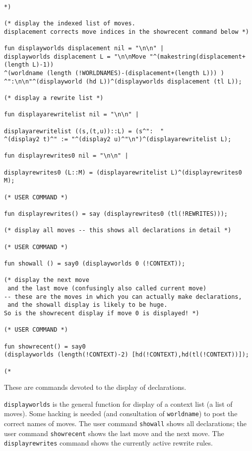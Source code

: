 \documentclass{article}
\begin{document}
\begin{verbatim}

*)

(* display the indexed list of moves.  
displacement corrects move indices in the showrecent command below *)

fun displayworlds displacement nil = "\n\n" |
displayworlds displacement L = "\n\nMove "^(makestring(displacement+(length L)-1))
^(worldname (length (!WORLDNAMES)-(displacement+(length L))) )
^":\n\n"^(displayworld (hd L))^(displayworlds displacement (tl L));

(* display a rewrite list *)

fun displayarewritelist nil = "\n\n" |

displayarewritelist ((s,(t,u))::L) = (s^":  "
^(display2 t)^" := "^(display2 u)^"\n")^(displayarewritelist L);

fun displayrewrites0 nil = "\n\n" |

displayrewrites0 (L::M) = (displayarewritelist L)^(displayrewrites0 M);

(* USER COMMAND *)

fun displayrewrites() = say (displayrewrites0 (tl(!REWRITES)));

(* display all moves -- this shows all declarations in detail *)

(* USER COMMAND *)

fun showall () = say0 (displayworlds 0 (!CONTEXT));

(* display the next move
 and the last move (confusingly also called current move) 
-- these are the moves in which you can actually make declarations,
 and the showall display is likely to be huge.  
So is the showrecent display if move 0 is displayed! *)

(* USER COMMAND *)

fun showrecent() = say0 
(displayworlds (length(!CONTEXT)-2) [hd(!CONTEXT),hd(tl(!CONTEXT))]);

(*

\end{verbatim}

These are commands devoted to the display of declarations.

{\tt displayworlds} is the general function for display of a context list (a list of moves).   Some hacking is needed (and consultation of {\tt worldname}) to post the correct names of moves.
The user command {\tt showall} shows all declarations;  the user command {\tt showrecent} shows the last move and the next move.  The {\tt displayrewrites} command shows the currently active rewrite rules.
\end{document}
